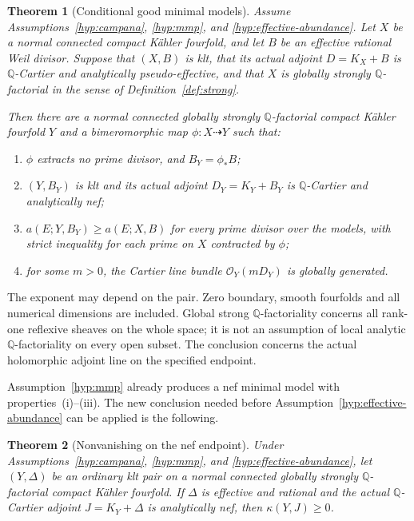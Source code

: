 \documentclass[11pt,letterpaper]{article}
\newtheorem{theorem}{Theorem}[section]
\theoremstyle{definition}
\theoremstyle{remark}
\begin{document}
\begin{theorem}[Conditional good minimal models]\label{thm:main}
Assume Assumptions~\ref{hyp:campana}, \ref{hyp:mmp}, and
\ref{hyp:effective-abundance}. Let \(X\) be a normal connected
compact K\"ahler fourfold, and let \(B\) be an effective rational
Weil divisor. Suppose that \((X,B)\) is klt, that its actual adjoint
\(D=K_X+B\) is \(\mathbb{Q}\)-Cartier and analytically
pseudo-effective, and that \(X\) is globally strongly
\(\mathbb{Q}\)-factorial in the sense of Definition~\ref{def:strong}.

Then there are a normal connected globally strongly
\(\mathbb{Q}\)-factorial compact K\"ahler fourfold \(Y\) and a
bimeromorphic map \(\phi:X\dashrightarrow Y\) such that:
\begin{enumerate}[label=\textup{(\roman*)}]
\item \(\phi\) extracts no prime divisor, and
      \(B_Y=\phi_*B\);
\item \((Y,B_Y)\) is klt and its actual adjoint
      \(D_Y=K_Y+B_Y\) is \(\mathbb{Q}\)-Cartier and analytically nef;
\item \(a(E;Y,B_Y)\ge a(E;X,B)\) for every prime divisor over
      the models, with strict inequality for each prime on \(X\)
      contracted by \(\phi\);
\item for some \(m>0\), the Cartier line bundle
      \(\mathcal{O}_Y(mD_Y)\) is globally generated.
\end{enumerate}
\end{theorem}

The exponent may depend on the pair. Zero boundary, smooth fourfolds
and all numerical dimensions are included. Global strong
\(\mathbb{Q}\)-factoriality concerns all rank-one reflexive sheaves on
the whole space; it is not an assumption of local analytic
\(\mathbb{Q}\)-factoriality on every open subset. The conclusion concerns
the actual holomorphic adjoint line on the specified endpoint.

Assumption~\ref{hyp:mmp} already produces a nef minimal model with
properties~\textup{(i)}--\textup{(iii)}. The new conclusion needed
before Assumption~\ref{hyp:effective-abundance} can be applied is
the following.

\begin{theorem}[Nonvanishing on the nef endpoint]
\label{thm:nonvanishing}
Under Assumptions~\ref{hyp:campana}, \ref{hyp:mmp}, and
\ref{hyp:effective-abundance}, let \((Y,\Delta)\) be an ordinary
klt pair on a normal connected globally strongly
\(\mathbb{Q}\)-factorial compact K\"ahler fourfold. If \(\Delta\)
is effective and rational and the actual \(\mathbb{Q}\)-Cartier adjoint
\(J=K_Y+\Delta\) is analytically nef, then
\(\kappa(Y,J)\ge0\).
\end{theorem}
\end{document}
